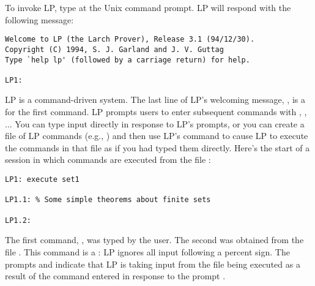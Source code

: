 
To invoke LP, type  at the Unix command prompt.  LP will respond with
the following message:
\begin{verbatim}
Welcome to LP (the Larch Prover), Release 3.1 (94/12/30).
Copyright (C) 1994, S. J. Garland and J. V. Guttag
Type `help lp' (followed by a carriage return) for help.

LP1:
\end{verbatim}
LP is a command-driven system.  The last line of LP's welcoming message,
, is a  for the first command.  LP prompts users to
enter subsequent commands with , , ...
\p
You can type input directly in response to LP's prompts, or you can create a
file of LP commands (e.g., ) and then use LP's
 command to cause LP to execute the commands in that file as if 
you had typed them directly.  Here's the start of a session in which commands
are executed from the file :
\begin{verbatim}
LP1: execute set1

LP1.1: % Some simple theorems about finite sets

LP1.2:
\end{verbatim}
The first command, , was typed by the user.  The second was
obtained from the file .  This command is a : LP
ignores all input following a percent sign.  The prompts  and
 indicate that LP is taking input from the file being executed as a
result of the command entered in response to the prompt .
